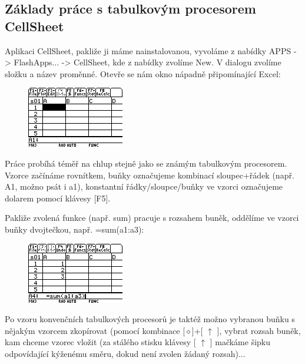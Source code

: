 \documentclass[10pt,a4paper,float]{article}
\begin{document}
\subsection{Základy práce s tabulkovým procesorem CellSheet}
Aplikaci CellSheet, pakliže ji máme nainstalovanou, vyvoláme z nabídky APPS -> FlashApps... -> CellSheet, kde z nabídky zvolíme New. V dialogu zvolíme složku a název proměnné. Otevře se nám okno nápadně připomínající Excel:

\begin{figure}[H]
	\centering
	\includegraphics[width=.5\textwidth]{img/CELL1}
\end{figure}

Práce probíhá téměř na chlup stejně jako se známým tabulkovým procesorem. Vzorce začínáme rovnítkem, buňky označujeme kombinací sloupec+řádek (např. A1, možno psát i a1), konstantní řádky/sloupce/buňky ve vzorci označujeme dolarem pomocí klávesy [F5].

\pagebreak

Pakliže zvolená funkce (např. sum) pracuje s rozsahem buněk, oddělíme ve vzorci buňky dvojtečkou, např. =sum(a1:a3):

\begin{figure}[H]
	\centering
	\includegraphics[width=.5\textwidth]{img/CELL2}
\end{figure}

Po vzoru konvenčních tabulkových procesorů je taktéž možno vybranou buňku s nějakým vzorcem zkopírovat (pomocí kombinace [$\diamond$]+[ $\uparrow$ ], vybrat rozsah buněk, kam chceme vzorec vložit (za stálého stisku klávesy [ $\uparrow$ ] mačkáme šipku odpovídající kýženému směru, dokud není zvolen žádaný rozsah)...
\end{document}
